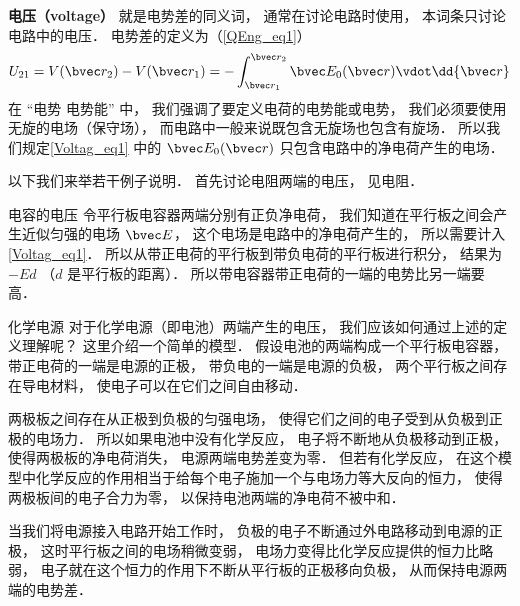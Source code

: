 

\textbf{电压（voltage）} 就是电势差的同义词， 通常在讨论电路时使用， 本词条只讨论电路中的电压． 电势差的定义为（\autoref{QEng_eq1}）
\begin{equation}\label{Voltag_eq1}
U_{21} = V(\bvec r_2) - V(\bvec r_1) = - \int_{\bvec r_1}^{\bvec r_2} \bvec E_0(\bvec r) \vdot \dd{\bvec r}
\end{equation}
在 “电势 电势能” 中， 我们强调了要定义电荷的电势能或电势， 我们必须要使用无旋的电场（保守场）， 而电路中一般来说既包含无旋场也包含有旋场． 所以我们规定\autoref{Voltag_eq1} 中的 $\bvec E_0(\bvec r)$ 只包含电路中的净电荷产生的电场．

以下我们来举若干例子说明． 首先讨论电阻两端的电压， 见电阻．

\begin{example}{电容的电压}
令平行板电容器两端分别有正负净电荷， 我们知道在平行板之间会产生近似匀强的电场 $\bvec E$， 这个电场是电路中的净电荷产生的， 所以需要计入\autoref{Voltag_eq1}． 所以从带正电荷的平行板到带负电荷的平行板进行积分， 结果为 $-E d$ （$d$ 是平行板的距离）． 所以带电容器带正电荷的一端的电势比另一端要高．
\end{example}

\begin{example}{化学电源}
对于化学电源（即电池）两端产生的电压， 我们应该如何通过上述的定义理解呢？ 这里介绍一个简单的模型． 假设电池的两端构成一个平行板电容器， 带正电荷的一端是电源的正极， 带负电的一端是电源的负极， 两个平行板之间存在导电材料， 使电子可以在它们之间自由移动．

两极板之间存在从正极到负极的匀强电场， 使得它们之间的电子受到从负极到正极的电场力． 所以如果电池中没有化学反应， 电子将不断地从负极移动到正极， 使得两极板的净电荷消失， 电源两端电势差变为零． 但若有化学反应， 在这个模型中化学反应的作用相当于给每个电子施加一个与电场力等大反向的恒力， 使得两极板间的电子合力为零， 以保持电池两端的净电荷不被中和．

当我们将电源接入电路开始工作时， 负极的电子不断通过外电路移动到电源的正极， 这时平行板之间的电场稍微变弱， 电场力变得比化学反应提供的恒力比略弱， 电子就在这个恒力的作用下不断从平行板的正极移向负极， 从而保持电源两端的电势差．
\end{example}

